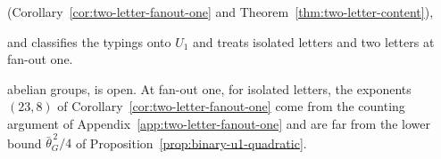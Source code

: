 (Corollary~\ref{cor:two-letter-fanout-one} and Theorem~\ref{thm:two-letter-content}),

and classifies the typings onto $U_1$ and treats isolated letters and two letters
at fan-out one.

abelian groups, is open.  At fan-out one, for isolated letters, the exponents
$(23,8)$ of Corollary~\ref{cor:two-letter-fanout-one} come from the counting
argument of Appendix~\ref{app:two-letter-fanout-one} and are far from the lower
bound $\bar\theta_G^{\,2}/4$ of Proposition~\ref{prop:binary-u1-quadratic}.

